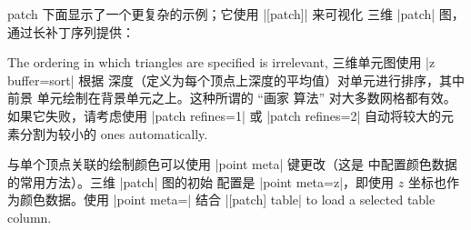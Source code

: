 {\begin{plottype}[/pgfplots]{patch}
    下面显示了一个更复杂的示例；它使用 |[patch]| 来可视化
    三维 |patch| 图，通过长补丁序列提供：
\pgfplotsexpensiveexample
\begin{codeexample}[]
\end{codeexample}
    \noindent The ordering in which triangles are specified is irrelevant,
        三维单元图使用 |z buffer=sort| 根据
        深度（定义为每个顶点上深度的平均值）对单元进行排序，其中前景
        单元绘制在背景单元之上。这种所谓的 ``画家
        算法'' 对大多数网格都有效。如果它失败，请考虑使用
        |patch refines=1| 或 |patch refines=2| 自动将较大的元素分割为较小的
    ones automatically.

    与单个顶点关联的绘制颜色可以使用 |point meta| 键更改（这是
    \PGFPlots 中配置颜色数据的常用方法）。三维 |patch| 图的初始
    配置是 |point meta=z|，即使用 $z$ 坐标也作为颜色数据。使用
    |point meta=\thisrow| 结合
    |[patch] table| to load a selected table column.


\end{plottype}}
